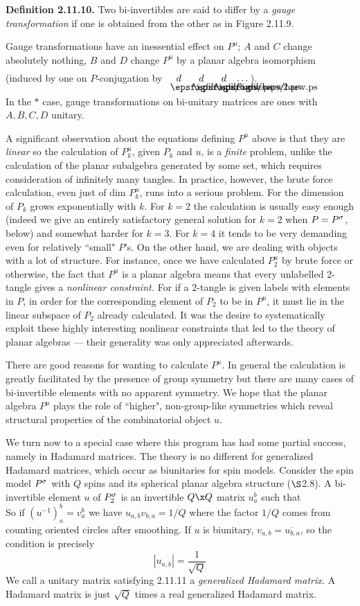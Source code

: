 {\bf Definition 2.11.10.} Two bi-invertibles are said to differ by
a {\it gauge transformation} if one is obtained from the other as
in Figure 2.11.9.

\bs Gauge transformations have an inessential effect on $P^u$; $A$
and $C$ change absolutely nothing, $B$ and $D$ change $P^u$ by a
planar algebra isomorphism (induced by one on $P$-conjugation by
\ $\boxa{d} \ \boxb{d} \ \boxa{d}\dots$).

In the $*$ case, gauge transformations on bi-unitary matrices are
ones with $A,B,C,D$ unitary.

A significant observation about the equations defining $P^u$ above
is that they are {\it linear} so the calculation of $P^u_k$, given
$P_k$ and $u$, is a {\it finite} problem, unlike the calculation of
the planar subalgebra generated by some set, which requires
consideration of infinitely many tangles. In practice, however, the
brute force calculation, even just of dim $P^u_k$, runs into a
serious problem. For the dimension of $P_k$ grows exponentially
with $k$. For $k=2$ the calculation is usually easy enough (indeed
we give an entirely satisfactory general solution for $k=2$ when
$P=P^\sigma$, below) and somewhat harder for $k=3$. For $k=4$ it tends
to be very demanding even for relatively ``small" $P$'s.
On the other hand, we are dealing with objects  with a lot of
structure. For instance, once we have calculated $P^u_2$ by brute
force or otherwise, the fact that $P^u$ is a planar algebra means
that every unlabelled 2-tangle gives a {\it nonlinear constraint.}
For if a 2-tangle is given labels with elements in  $P$, in order
for the corresponding element of $P_2$ to be in $P^u$, it must lie
in the linear subspace of $P_2$ already calculated. It was the
desire to systematically exploit these highly interesting nonlinear
constraints that led to the theory of planar algebras --- their
generality was only appreciated afterwards.

There are good reasons for wanting to calculate $P^u$. In general
the calculation is greatly facilitated by the presence of group
symmetry but there are many cases of bi-invertible elements with no
apparent symmetry. We hope that the planar algebra $P^u$ plays the
role of ``higher", non-group-like symmetries which reveal
structural properties of the combinatorial object $u$.

We turn now to a special case where this program has had some
partial success, namely in Hadamard matrices.  The theory is no
different for generalized Hadamard matrices, which occur as
biunitaries for spin models. Consider the spin model  $P^\sigma$ with
$Q$ spins and its spherical planar algebra structure ($\S$2.8). A
bi-invertible element $u$ of $P^\sigma_2$ is an invertible $Q\x Q$
matrix $u^b_a$ such that
\[
	
\]
\ni So if $(u^{-1})^b_a=v^b_a$ we have $u_{a,b}v_{b,a}=1/Q$ where
the factor $1/Q$ comes from counting oriented circles after
smoothing. If $u$ is biunitary, $v_{a,b}=\overline{u_{b,a}}$, so
the condition is precisely
\[
 |u_{a,b}|=\frac{1}{\sqrt{Q}} %
\]
We call a unitary matrix satisfying 2.11.11 a {\it
generalized Hadamard matrix.} A Hadamard matrix is just $\sqrt{Q}$
times a real generalized Hadamard matrix.

